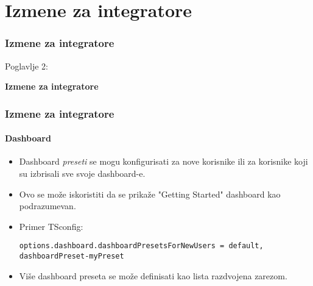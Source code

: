 %

\section{Izmene za integratore}
\begin{frame}[fragile]
	\frametitle{Izmene za integratore}

	\begin{center}\huge{Poglavlje 2:}\end{center}
	\begin{center}\huge{\color{typo3darkgrey}\textbf{Izmene za integratore}}\end{center}

\end{frame}


\begin{frame}[fragile]
	\frametitle{Izmene za integratore}
	\framesubtitle{Dashboard}

	\lstset{basicstyle=\tiny\ttfamily}

	\begin{itemize}
		\item Dashboard \textit{preseti} se mogu konfigurisati za nove korisnike
		ili za korisnike koji su izbrisali sve svoje dashboard-e.
		\item Ovo se može iskoristiti da se prikaže "Getting Started" dashboard kao podrazumevan.
		\item Primer TSconfig:

\vspace{-0.4cm}
\begin{lstlisting}
options.dashboard.dashboardPresetsForNewUsers = default, dashboardPreset-myPreset
\end{lstlisting}

		\item Više dashboard preseta se može definisati kao lista razdvojena zarezom.

	\end{itemize}

\end{frame}

